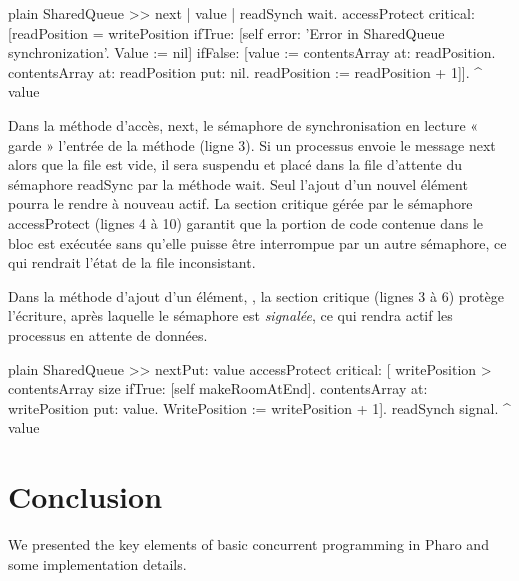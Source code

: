 \documentclass[10pt,twoside,english]{_support/latex/sbabook/sbabook}
\begin{document}
\begin{displaycode}{plain}
SharedQueue >> next
	| value |
	readSynch wait.
	accessProtect
		critical: [readPosition = writePosition
				ifTrue: [self error: 'Error in SharedQueue synchronization'.
					Value := nil]
				ifFalse: [value := contentsArray at: readPosition.
					contentsArray at: readPosition put: nil.
					readPosition := readPosition + 1]].
	^ value
\end{displaycode}

Dans la m\'{e}thode d’acc\`{e}s, next, le s\'{e}maphore de synchronisation en lecture « garde » l’entr\'{e}e de la m\'{e}thode (ligne 3). Si un processus envoie le message next alors que la file est vide, il sera suspendu et plac\'{e} dans la file d’attente du s\'{e}maphore readSync par la m\'{e}thode wait. Seul l’ajout d’un nouvel \'{e}l\'{e}ment pourra le rendre \`{a} nouveau actif. La section critique g\'{e}r\'{e}e par le s\'{e}maphore accessProtect (lignes 4 \`{a} 10) garantit que la portion de code contenue dans le bloc est ex\'{e}cut\'{e}e sans qu’elle puisse \^{e}tre interrompue par un autre s\'{e}maphore, ce qui rendrait l’\'{e}tat de la file inconsistant.

Dans la m\'{e}thode d’ajout d’un \'{e}l\'{e}ment, , la section critique (lignes 3 \`{a} 6) prot\`{e}ge l’\'{e}criture, apr\`{e}s laquelle le s\'{e}maphore  est \textit{signal\'{e}e}, ce qui rendra actif les processus en attente de donn\'{e}es.

\begin{displaycode}{plain}
SharedQueue >> nextPut: value 
	accessProtect
		critical: [ writePosition > contentsArray size
				ifTrue: [self makeRoomAtEnd].
			contentsArray at: writePosition put: value.
			WritePosition := writePosition + 1].
			readSynch signal.
			^ value
\end{displaycode}
\section{Conclusion}
We presented the key elements of basic concurrent programming in Pharo and some implementation details.


\backmatter

\end{document}

